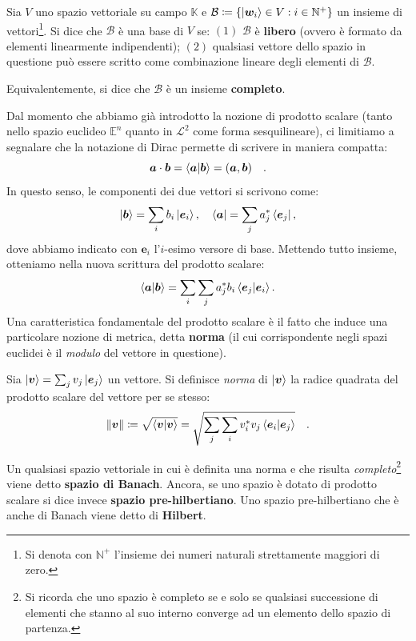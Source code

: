 \begin{definizione}
    Sia $V$ uno spazio vettoriale su campo $\mathbb{K}$ e $\mathcal{B} \coloneq \{ \ket{\bm{w}_i} \in V : i \in \mathbb{N}^+ \} $ un insieme di vettori\footnote{Si denota con $\mathbb{N}^+$ l'insieme dei numeri naturali strettamente maggiori di zero.}. Si dice che $\mathcal{B}$ è una base di $V$ se: $(1)$ $\mathcal{B}$ è \textbf{libero} (ovvero è formato da elementi linearmente indipendenti); $(2)$ qualsiasi vettore dello spazio in questione può essere scritto come combinazione lineare degli elementi di $\mathcal{B}$. 

    Equivalentemente, si dice che $\mathcal{B}$ è un insieme \textbf{completo}.
\end{definizione}
Dal momento che abbiamo già introdotto la nozione di prodotto scalare (tanto nello spazio euclideo $\mathbb{E}^n$ quanto in $\mathcal{L}^2$ come forma sesquilineare), ci limitiamo a segnalare che la notazione di Dirac permette di scrivere in maniera compatta:
\[
    \bm{a} \cdot \bm{b} = \bra{\bm{a}} \ket{\bm{b}} = (\bm{a}, \bm{b}) \quad.
\]
In questo senso, le componenti dei due vettori si scrivono come:
\[
    \ket{\bm{b}} = \sum_i b_i \ket{\bm{e}_i}, \quad \bra{\bm{a}} = \sum_j a_j^* \bra{\bm{e}_j},
\]
dove abbiamo indicato con $\bm{e}_i$ l'$i$-esimo versore di base. Mettendo tutto insieme, otteniamo nella nuova scrittura del prodotto scalare:
\[
    \bra{\bm{a}} \ket{\bm{b}} = \sum_i \sum_j a_j^*b_i \bra{\bm{e}_j}\ket{\bm{e}_i}. 
\]
Una caratteristica fondamentale del prodotto scalare è il fatto che induce una particolare nozione di metrica, detta \textbf{norma} (il cui corrispondente negli spazi euclidei è il \emph{modulo} del vettore in questione). 

\begin{definizione}
    Sia $\ket{\bm{v}} = \sum_j v_j \ket{\bm{e}_j}$ un vettore. Si definisce \emph{norma} di $\ket{\bm{v}}$ la radice quadrata del prodotto scalare del vettore per se stesso:
    \[
        \norm{\bm{v}} \coloneq \sqrt{\bra{\bm{v}} \ket{\bm{v}}} = \sqrt{\sum_j \sum_i v_i^* v_j \bra{\bm{e}_i}\ket{\bm{e}_j}} \quad.
    \]
\end{definizione}
Un qualsiasi spazio vettoriale in cui è definita una {norma} e che risulta \emph{completo}\footnote{Si ricorda che uno spazio è completo se e solo se qualsiasi successione di elementi che stanno al suo interno converge ad un elemento dello spazio di partenza.} viene detto \textbf{spazio di Banach}. Ancora, se uno spazio è dotato di prodotto scalare si dice invece \textbf{spazio pre-hilbertiano}. Uno spazio pre-hilbertiano che è anche di Banach viene detto di \textbf{Hilbert}.

